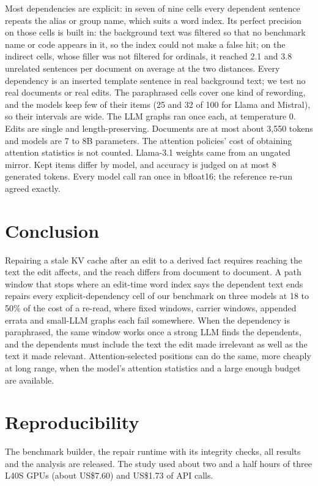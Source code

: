 \documentclass[conference]{IEEEtran}
\begin{document}
Most dependencies are explicit: in seven of nine cells every dependent sentence repeats the alias or group name,
which suits a word index. Its perfect precision on those cells is built in: the background text was filtered so
that no benchmark name or code appears in it, so the index could not make a false hit; on the indirect cells,
whose filler was not filtered for ordinals, it reached 2.1 and 3.8 unrelated sentences per document on average at the two distances. Every
dependency is an inserted template sentence in real background text; we test no real documents or real
edits. The paraphrased cells cover one kind of rewording, and the models keep few of their
items (25 and 32 of 100 for Llama and Mistral), so their intervals are wide. The LLM graphs ran once each, at
temperature 0. Edits are single and length-preserving. Documents are at most about 3,550 tokens
and models are 7 to 8B parameters. The attention policies' cost of obtaining attention statistics is not
counted. Llama-3.1 weights came from an ungated mirror. Kept items differ by model, and
accuracy is judged on at most 8 generated tokens. Every model call ran once in bfloat16; the reference re-run
agreed exactly.

\section{Conclusion}

Repairing a stale KV cache after an edit to a derived fact requires reaching the text the edit affects, and the
reach differs from document to document. A path window that stops where an edit-time word index says the
dependent text ends repairs every explicit-dependency cell of our benchmark on three models at 18 to 50\% of the
cost of a re-read, where fixed windows, carrier windows, appended errata and small-LLM graphs each fail
somewhere. When the dependency is paraphrased, the same window works once a strong LLM finds the dependents, and
the dependents must include the text the edit made irrelevant as well as the text it made relevant.
Attention-selected positions can do the same, more cheaply at long range, when the model's attention
statistics and a large enough budget are available.

\section*{Reproducibility}

The benchmark builder, the repair runtime with its integrity checks, all results and the analysis are
released. The study used about two and a half hours of three L40S GPUs (about US\$7.60) and US\$1.73 of API
calls.



\end{document}
